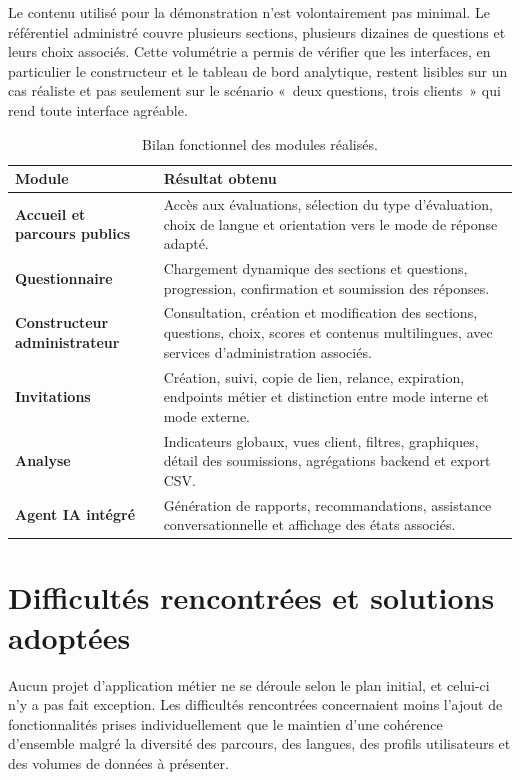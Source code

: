 \documentclass[12pt,a4paper]{report}
\begin{document}
Le contenu utilisé pour la démonstration n'est volontairement pas minimal. Le référentiel administré couvre plusieurs sections, plusieurs dizaines de questions et leurs choix associés. Cette volumétrie a permis de vérifier que les interfaces, en particulier le constructeur et le tableau de bord analytique, restent lisibles sur un cas réaliste et pas seulement sur le scénario «~deux questions, trois clients~» qui rend toute interface agréable.

\begin{table}[H]
\centering
\caption{Bilan fonctionnel des modules réalisés.}
\begin{tabularx}{\textwidth}{>{\bfseries}L{4cm}Y}
\toprule
Module & Résultat obtenu \\
\midrule
Accueil et parcours publics & Accès aux évaluations, sélection du type d'évaluation, choix de langue et orientation vers le mode de réponse adapté. \\
Questionnaire & Chargement dynamique des sections et questions, progression, confirmation et soumission des réponses. \\
Constructeur administrateur & Consultation, création et modification des sections, questions, choix, scores et contenus multilingues, avec services d'administration associés. \\
Invitations & Création, suivi, copie de lien, relance, expiration, endpoints métier et distinction entre mode interne et mode externe. \\
Analyse & Indicateurs globaux, vues client, filtres, graphiques, détail des soumissions, agrégations backend et export CSV. \\
Agent IA intégré & Génération de rapports, recommandations, assistance conversationnelle et affichage des états associés. \\
\bottomrule
\end{tabularx}
\end{table}

\section*{Difficultés rencontrées et solutions adoptées}
Aucun projet d'application métier ne se déroule selon le plan initial, et celui-ci n'y a pas fait exception. Les difficultés rencontrées concernaient moins l'ajout de fonctionnalités prises individuellement que le maintien d'une cohérence d'ensemble malgré la diversité des parcours, des langues, des profils utilisateurs et des volumes de données à présenter.
\end{document}
